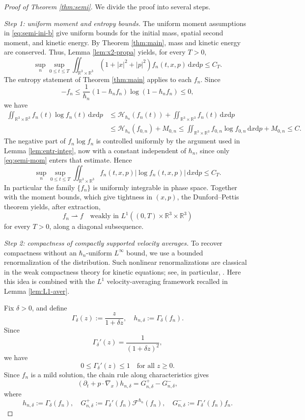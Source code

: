\documentclass[10pt,reqno]{amsart}
\numberwithin{equation}{section}
\theoremstyle{definition}
\newcommand{\R}{\mathbb R}
\newcommand{\dx}{\mathrm{d}x}
\newcommand{\dpp}{\mathrm{d}p}
\newcommand{\calF}{\mathcal F}
\newcommand{\bq}{\begin{equation}}
\newcommand{\eq}{\end{equation}}
\newcommand{\pa}{\partial}
\begin{document}
\begin{proof}[Proof of Theorem \ref{thm:semi}]


We divide the proof into several steps.

\emph{Step 1: uniform moment and entropy bounds.}
The uniform moment assumptions in \eqref{eq:semi-ini-b} give uniform bounds for the initial mass, spatial second moment, and kinetic energy.  By Theorem \ref{thm:main}, mass and kinetic energy are conserved.  Thus, Lemma \ref{lem:x2-propa} yields, for every $T>0$,
\bq \label{eq:semi-mom}
 \sup_n\sup_{0\leq t\leq T}  \iint_{\R^3\times\R^3}(1+|x|^2+|p|^2)f_n(t,x,p)\,\dx\dpp  \leq C_T.
\eq
The entropy statement of Theorem \ref{thm:main} applies to each $f_n$.  Since
\[
 -f_n\leq  \frac1{\hbar_n}(1-\hbar_nf_n)\log(1-\hbar_nf_n)  \leq0,
\]
we have
\begin{align*}
 \iint_{\R^3\times\R^3} f_n(t)\log f_n(t)\,\dx\dpp  &\leq \mathscr H_{\hbar_n}(f_n(t))  +\iint_{\R^3\times\R^3} f_n(t)\,\dx\dpp\\
 &\leq \mathscr H_{\hbar_n}(f_{0,n})+M_{0,n} \leq \iint_{\R^3\times\R^3} f_{0,n}\log f_{0,n}\,\dx\dpp+M_{0,n}  \leq C.
\end{align*}
The negative part of $f_n\log f_n$ is controlled uniformly by the argument used in Lemma \ref{lem:entr-integ}, now with a constant independent of $\hbar_n$, since only \eqref{eq:semi-mom} enters that estimate.  Hence
\bq \label{eq:semi-LlogL}
 \sup_n\sup_{0\leq t\leq T}  \iint_{\R^3\times \R^3} f_n(t,x,p)|\log f_n(t,x,p)|\,\dx\dpp  \leq C_T.
\eq
In particular the family $\{f_n\}$ is uniformly integrable in phase space.  Together with the moment bounds, which give tightness in $(x,p)$, the Dunford--Pettis theorem yields, after extraction,
\bq \label{eq:semi-weak}
 f_n\rightharpoonup f  \quad\text{weakly in }L^1((0,T)\times\R^3\times\R^3)
\eq
for every $T>0$, along a diagonal subsequence.

\emph{Step 2: compactness of compactly supported velocity averages.}  To recover compactness without an $\hbar_n$-uniform $L^\infty$ bound, we use a bounded renormalization of the distribution.  Such nonlinear renormalizations are classical in the weak compactness theory for kinetic equations; see, in particular, \cite{DL89,Mis10,MP97}.  Here this idea is combined with the $L^1$ velocity-averaging framework recalled in Lemma \ref{lem:L1-aver}.

Fix $\delta>0$, and define
\[
 \Gamma_\delta(z):=\frac{z}{1+\delta z},  \quad  h_{n,\delta}:=\Gamma_\delta(f_n).
\]
Since
\[
 \Gamma_\delta'(z)=\frac1{(1+\delta z)^2},
\]
we have
\bq \label{eq:Gam-deri-bd}
 0\leq \Gamma_\delta'(z)\leq1  \quad\text{for all }z\geq0.
\eq
Since $f_n$ is a mild solution, the chain rule along characteristics gives
\bq \label{eq:semi-renorm}
 (\pa_t+p\cdot\nabla_x)h_{n,\delta}  =  G_{n,\delta}^+-G_{n,\delta}^-,
\eq
where
\[
 h_{n,\delta} := \Gamma_\delta(f_n) , \quad G_{n,\delta}^+  :=  \Gamma_\delta'(f_n)\calF^{\hbar_n}(f_n),  \quad  G_{n,\delta}^-  :=  \Gamma_\delta'(f_n)f_n.
\]


\end{proof}
\end{document}
